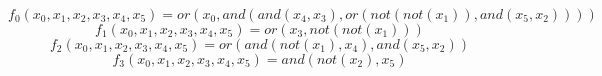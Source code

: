\documentclass{article}
\begin{document}
\begin{equation}
f_0(x_0,x_1,x_2,x_3,x_4,x_5)=or(x_0, and(and(x_4, x_3), or(not(not(x_1)), and(x_5, x_2))))
\end{equation}\begin{equation}
f_1(x_0,x_1,x_2,x_3,x_4,x_5)=or(x_3, not(not(x_1)))
\end{equation}\begin{equation}
f_2(x_0,x_1,x_2,x_3,x_4,x_5)=or(and(not(x_1), x_4), and(x_5, x_2))
\end{equation}\begin{equation}
f_3(x_0,x_1,x_2,x_3,x_4,x_5)=and(not(x_2), x_5)
\end{equation}
\end{document}
